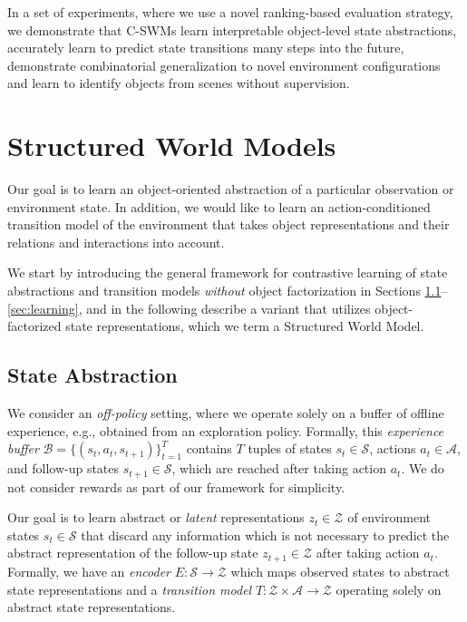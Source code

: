 \documentclass{article} %
\begin{document}
In a set of experiments, where we use a novel ranking-based evaluation strategy, we demonstrate that C-SWMs learn interpretable object-level state abstractions, accurately learn to predict state transitions many steps into the future, demonstrate combinatorial generalization to novel environment configurations and learn to identify objects from scenes without supervision.

\section{Structured World Models}
Our goal is to learn an object-oriented abstraction of a particular observation or environment state. In addition, we would like to learn an action-conditioned transition model of the environment that takes object representations and their relations and interactions into account.

We start by introducing the general framework for contrastive learning of state abstractions and transition models \emph{without} object factorization in Sections \ref{sec:representations}--\ref{sec:learning}, and in the following describe a variant that utilizes object-factorized state representations, which we term a Structured World Model.

\subsection{State Abstraction}\label{sec:representations}
We consider an \emph{off-policy} setting, where we operate solely on a buffer of offline experience, e.g., obtained from an exploration policy. Formally, this \emph{experience buffer} $\mathcal{B}=\{(s_t, a_t, s_{t+1})\}_{t=1}^T$ contains $T$ tuples of states $s_t\in\mathcal{S}$, actions $a_t\in\mathcal{A}$, and follow-up states $s_{t+1}\in\mathcal{S}$, which are reached after taking action $a_t$. We do not consider rewards as part of our framework for simplicity.

Our goal is to learn abstract or \textit{latent} representations $z_t\in\mathcal{Z}$ of environment states $s_t\in\mathcal{S}$ that discard any information which is not necessary to predict the abstract representation of the follow-up state $z_{t+1}\in\mathcal{Z}$ after taking action $a_t$. Formally, we have an \emph{encoder} $E: \mathcal{S}\rightarrow \mathcal{Z}$ which maps observed states to abstract state representations and a \emph{transition model} $T: \mathcal{Z}\times\mathcal{A}\rightarrow \mathcal{Z}$ operating solely on abstract state representations.
\end{document}
